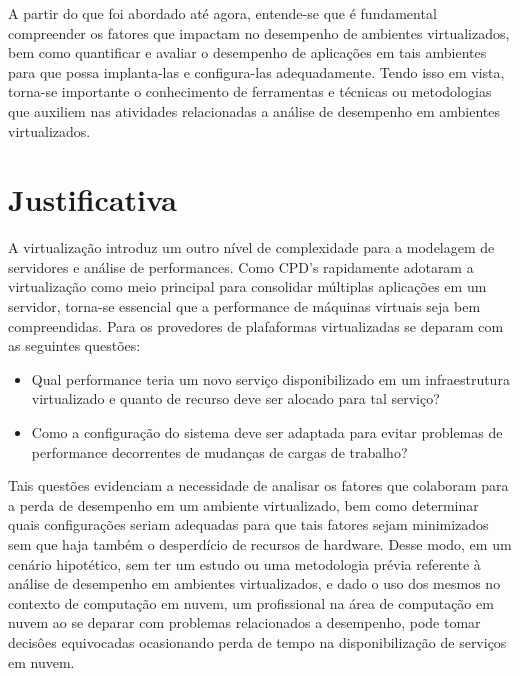 A partir do que foi abordado até agora, entende-se que é fundamental compreender os fatores que impactam no desempenho de ambientes virtualizados, bem como quantificar e avaliar o desempenho de aplicações em tais ambientes para que possa implanta-las e configura-las adequadamente. Tendo isso em vista, torna-se importante o conhecimento de ferramentas e técnicas ou metodologias que auxiliem nas atividades relacionadas a análise de desempenho em ambientes virtualizados. 



\section{Justificativa}
A virtualização introduz um outro nível de complexidade para a modelagem de servidores e análise de performances. Como CPD's rapidamente adotaram a virtualização como meio principal para consolidar múltiplas aplicações em um servidor, torna-se essencial que a performance de máquinas virtuais seja bem compreendidas\cite{ticko2010}. Para  os provedores de plafaformas virtualizadas se deparam com as seguintes questões:

\begin{itemize}
  \item Qual performance teria um novo serviço disponibilizado em um infraestrutura virtualizado e quanto de recurso deve ser alocado para tal serviço?

  \item Como a configuração do sistema deve ser adaptada para evitar problemas de performance decorrentes de mudanças de cargas de trabalho?
\end{itemize}


Tais questões evidenciam a necessidade de analisar os fatores que colaboram para a perda de desempenho em um ambiente virtualizado, bem como determinar quais configurações seriam adequadas para que tais fatores sejam minimizados sem que haja também o desperdício de recursos de hardware. Desse modo, em um cenário hipotético, sem ter um estudo ou uma metodologia prévia referente à análise de desempenho em ambientes virtualizados, e dado o uso dos mesmos no contexto de computação em nuvem, um profissional na área de computação em nuvem ao se deparar com problemas relacionados a desempenho, pode tomar decisôes equivocadas ocasionando perda de tempo na disponibilização de serviços em nuvem.



